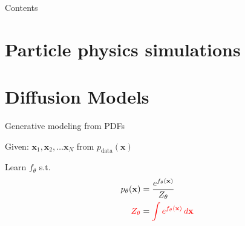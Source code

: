 \documentclass[aspectratio=169,xcolor=dvipsnames]{beamer}
\newcommand{\bx}{\mathbf{x}}
\begin{document}
\begin{frame}[plain]
  \titlepage
\end{frame}

\begin{frame}[plain]{Contents}
  \tableofcontents
\end{frame}

\section{Particle physics simulations}
\begin{frame}{}
  
\end{frame}

\section{Diffusion Models}
\begin{frame}{Generative modeling from PDFs}

Given: $\bx_1, \bx_2, \dots \bx_N$ from $p_\text{data}(\bx)$
\vspace{0.25cm}

Learn $f_\theta$ s.t.
\begin{align*}
    p_{\theta}(\bx) &= \frac{e^{f_\theta(\bx)}}{Z_\theta}\\
    \textcolor{red}{Z_\theta} &= \textcolor{red}{\int e^{f_\theta(\bx)} \,d\bx}
\end{align*}

\end{frame}
\end{document}
